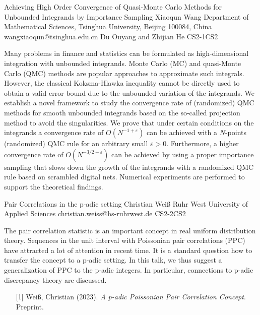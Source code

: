 \begin{talk}
  {Achieving High Order Convergence of Quasi-Monte Carlo Methods for 
   Unbounded Integrands by Importance Sampling}         %
  {Xiaoqun Wang}                                        %
  {Department of Mathematical Sciences, Tsinghua University, Beijing 100084, China}%
  {wangxiaoqun@tsinghua.edu.cn}%
  {Du Ouyang and Zhijian He
  }%
{}{}{CS2-1}{CS2}

		
	
Many problems in finance and statistics can be formulated as high-dimensional integration 
with unbounded integrands. Monte Carlo (MC) and quasi-Monte Carlo (QMC) methods are popular 
approaches to approximate such integrals. However, the classical Koksma-Hlawka inequality 
cannot be directly used to obtain a valid error bound due to the unbounded variation of
the integrands. We establish a novel framework to study the convergence rate of (randomized) 
QMC methods for smooth unbounded integrands based on the so-called projection method to avoid the 
singularities. We prove that under certain conditions on the integrands a convergence rate of 
$O(N^{-1+\varepsilon})$ can be achieved with a $N$-points (randomized) QMC rule for an arbitrary 
small $\varepsilon >0$. Furthermore, a higher convergence rate of $O(N^{-3/2+\varepsilon})$ can be 
achieved by using a proper importance sampling that slows down the growth of the integrands with a
randomized QMC rule based on scrambled digital nets. Numerical experiments are performed to support 
the theoretical findings.
\end{talk}			

\begin{talk}
  {Pair Correlations in the p-adic setting}%
  {Christian Wei\ss{}}%
  {Ruhr West University of Applied Sciences}%
  {christian.weiss@hs-ruhrwest.de}%
  {}%
{}{}{CS2-2}{CS2}

			
The pair correlation statistic is an important concept in real uniform distribution theory. Sequences in the unit interval with Poissonian pair correlations (PPC) have attracted a lot of attention in recent time. It is a standard question how to transfer the concept to a p-adic setting. In this talk, we thus suggest a generalization of PPC to the p-adic integers. In particular, connections to p-adic discrepancy theory are discussed.

\medskip
\begin{enumerate}
	\item[{[1]}] Wei\ss{}, Christian (2023). {\it A p-adic Poissonian Pair Correlation Concept}. Preprint.
\end{enumerate}

\end{talk}

